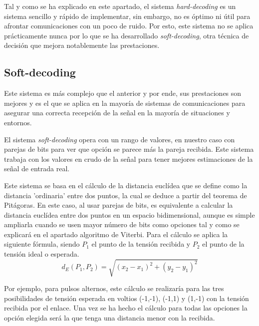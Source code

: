 Tal y como se ha explicado en este apartado, el sistema \textit{hard-decoding} es 
un sistema sencillo y rápido de implementar, sin embargo, no es 
óptimo ni útil para afrontar comunicaciones con un poco de ruido. Por esto, este sistema
no se aplica prácticamente nunca por lo que 
se ha desarrollado \textit{soft-decoding}, otra técnica de decisión que mejora notablemente
las prestaciones.

\subsection{Soft-decoding}
Este sistema es más complejo que el anterior y por ende, sus prestaciones son mejores y 
es el que se aplica en la mayoría de sistemas de comunicaciones para asegurar una 
correcta recepción de la señal en la mayoría de situaciones y entornos.

El sistema \textit{soft-decoding} opera con un rango de valores, en nuestro caso con 
parejas de bits para ver que opción se parece más la pareja recibida. Este sistema 
trabaja con los valores en crudo de la señal para tener mejores estimaciones de la señal
de entrada real. 

Este sistema se basa en el cálculo de la distancia euclídea 
que se define como la
distancia 'ordinaria' entre dos puntos, la cual se deduce a partir del teorema de 
Pitágoras. En este caso, al usar parejas de bits, es equivalente a calcular la distancia
euclídea entre dos puntos en un espacio bidimensional, aunque es simple ampliarla cuando se 
usen mayor número de bits como opciones tal y como se explicará en el apartado 
algoritmo de Viterbi. Para el cálculo se aplica la siguiente fórmula,
siendo $P_1$ el punto de la tensión recibida y $P_2$ el punto de la tensión ideal 
o esperada. \cite{euclidean}
\[ d_E(P_1,P_2) = \sqrt{(x_2 - x_1)^2 + (y_2 - y_1)^2} \] 

Por ejemplo, para pulsos alternos, este cálculo se realizaría para las 
tres posibilidades de tensión esperada en voltios (-1,-1), (-1,1) y (1,-1) con la 
tensión recibida por el enlace. Una vez se ha hecho el cálculo para todas las opciones
la opción elegida será la que tenga una distancia menor con la recibida.


